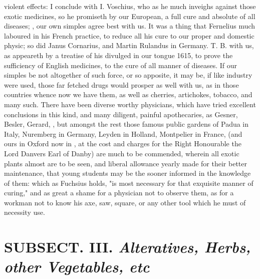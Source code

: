 {violent effects: I conclude with I. Voschius, who as he much inveighs against those exotic medicines, so he promiseth by our European, a full cure and absolute of all diseases; , our own simples agree best with us. It was a thing that Fernelius much laboured in his French practice, to reduce all his cure to our proper and domestic physic; so did Janus Cornarius, and Martin Rulandus in Germany. T. B. with us, as appeareth by a treatise of his divulged in our tongue 1615, to prove the sufficiency of English medicines, to the cure of all manner of diseases. If our simples be not altogether of such force, or so apposite, it may be, if like industry were used, those far fetched drugs would prosper as well with us, as in those countries whence now we have them, as well as cherries, artichokes, tobacco, and many such. There have been diverse worthy physicians, which have tried excellent conclusions in this kind, and many diligent, painful apothecaries, as Gesner, Besler, Gerard, \etc{}, but amongst the rest those famous public gardens of Padua in Italy, Nuremberg in Germany, Leyden in Holland, Montpelier in France, (and ours in Oxford now in , at the cost and charges for the Right Honourable the Lord Danvers Earl of Danby) are much to be commended, wherein all exotic plants almost are to be seen, and liberal allowance yearly made for their better maintenance, that young students may be the sooner informed in the knowledge of them: which as Fuchsius holds, "is most necessary for that exquisite manner of curing," and as great a shame for a physician not to observe them, as for a workman not to know his axe, saw, square, or any other tool which he must of necessity use.

\section{ SUBSECT. III. \emph{Alteratives, Herbs, other Vegetables, etc}}


}

